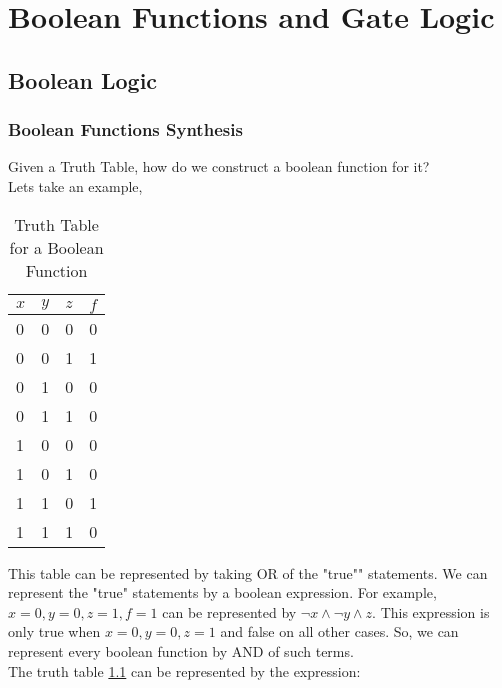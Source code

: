 \chapter{Boolean Functions and Gate Logic}

\section{Boolean Logic}

\subsection{Boolean Functions Synthesis}

Given a Truth Table, how do we construct a boolean function for it?\\

Lets take an example, 

\begin{table}[h!]
    \begin{center} 
        \caption{Truth Table for a Boolean Function}
        \label{tab:example1}
        \begin{tabular}{l|l|l|l}
            $x$ & $y$ & $z$ & $f$\\
            \hline
            0 & 0 & 0 & 0\\
            0 & 0 & 1 & 1\\
            0 & 1 & 0 & 0\\
            0 & 1 & 1 & 0\\
            1 & 0 & 0 & 0\\
            1 & 0 & 1 & 0\\
            1 & 1 & 0 & 1\\
            1 & 1 & 1 & 0\\
        \end{tabular}
    \end{center}
\end{table}

This table can be represented by taking OR of the "true"" statements. 
We can represent the "true" statements by a boolean expression.
For example, $x = 0, y = 0, z = 1, f = 1$ can be represented by
$\neg x \land \neg y \land z$. This expression is only true when
$x = 0, y = 0, z = 1$ and false on all other cases. So, we can
represent every boolean function by AND of such terms.\\

The truth table \ref{tab:example1} can be represented by the expression:

